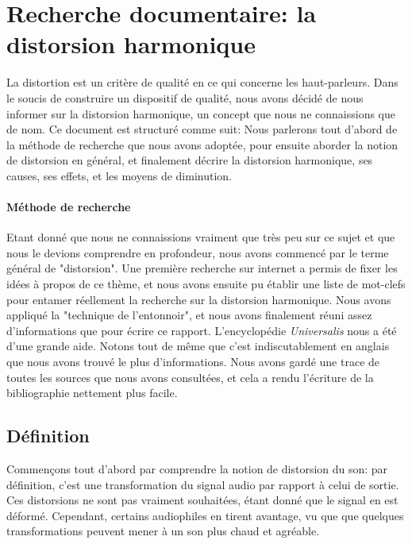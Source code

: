

\section{Recherche documentaire: la distorsion harmonique}

La distortion est un critère de qualité en ce qui concerne les haut-parleurs.
Dans le soucis de construire un dispositif de qualité, nous avons décidé de 
nous informer sur la distorsion harmonique, un concept que nous ne connaissions
que de nom.
Ce document est structuré comme suit: Nous parlerons tout d'abord de la méthode 
de recherche que nous avons adoptée, pour ensuite aborder la notion  de distorsion 
en général, et finalement décrire la distorsion harmonique, ses causes, ses effets,
et les moyens de diminution.

\paragraph{Méthode de recherche}
Etant donné que nous ne connaissions vraiment que très peu sur ce sujet et que nous 
le devions comprendre en profondeur, nous avons commencé par le terme général de "distorsion". 
Une première recherche sur internet a permis de fixer les idées à propos de ce thème, et nous 
avons ensuite pu établir une liste de mot-clefs pour entamer réellement la recherche sur la 
distorsion harmonique. Nous avons appliqué la "technique de l'entonnoir", et nous avons finalement 
réuni assez d'informations que pour écrire ce rapport. L'encyclopédie \textit{Universalis} nous a 
été d'une grande aide. Notons tout de même que c'est indiscutablement en anglais que nous avons 
trouvé le plus d'informations. Nous avons gardé une trace de toutes les sources que nous avons 
consultées, et cela a rendu l'écriture de la bibliographie nettement plus facile.

\subsection{Définition}
Commençons tout d'abord par comprendre la notion de distorsion du son: par définition, c'est
une transformation du signal audio par rapport à celui de sortie. Ces distorsions ne sont pas vraiment souhaitées, étant donné
que le signal en est déformé. Cependant, certains audiophiles en tirent avantage, vu que que quelques
transformations peuvent mener à un son plus chaud et agréable.

